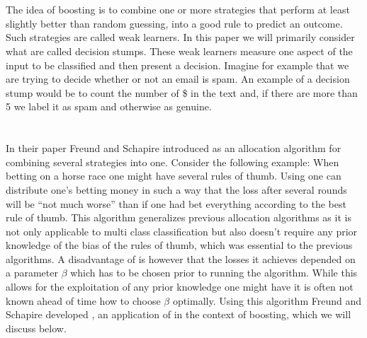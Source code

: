 \section{\weak}
The idea of boosting is to combine one or more strategies that perform at least slightly better than random guessing, into a good rule to predict an outcome. Such strategies are called weak learners. In this paper we will primarily consider what are called decision stumps. These weak learners measure one aspect of the input to be classified and then present a decision. Imagine for example that we are trying to decide whether or not an email is spam. An example of a decision stump would be to count the number of \$ in the text and, if there are more than 5 we label it as spam and otherwise as genuine. 

\newpage \section{\hedge}
In their paper Freund and Schapire introduced \hedge as an allocation algorithm for combining several strategies into one. Consider the following example: When betting on a horse race one might have several rules of thumb. Using \hedge one can distribute one's betting money in such a way that the loss after several rounds will be ``not much worse'' than if one had bet everything according to the best rule of thumb. This algorithm generalizes previous allocation algorithms as it is not only applicable to multi class classification but also doesn't require any prior knowledge of the bias of the rules of thumb, which was essential to the previous algorithms. A disadvantage of \hedge is however that the losses it achieves depended on a parameter $\beta$ which has to be chosen prior to running the algorithm. While this allows for the exploitation of any prior knowledge one might have it is often not known ahead of time how to choose $\beta$ optimally. Using this \hedge algorithm Freund and Schapire developed \adaB, an application of \hedge in the context of boosting, which we will discuss below. 

